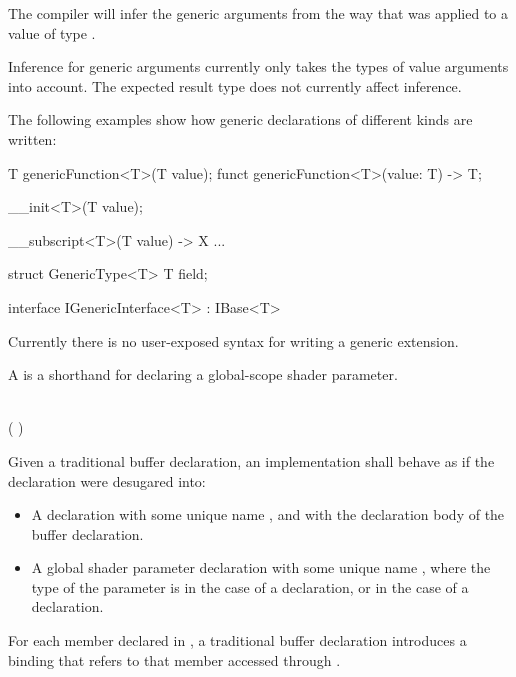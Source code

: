 The compiler will infer the generic arguments  from the way that  was applied to a value of type .

\begin{Note}
Inference for generic arguments currently only takes the types of value arguments into account.
The expected result type does not currently affect inference.
\end{Note}


The following examples show how generic declarations of different kinds are written:

\begin{codeblock}
T genericFunction<T>(T value);
funct genericFunction<T>(value: T) -> T;

__init<T>(T value);

__subscript<T>(T value) -> X { ... }

struct GenericType<T>
{
    T field;
}

interface IGenericInterface<T> : IBase<T>
{
}
\end{codeblock}

\begin{Note}
Currently there is no user-exposed syntax for writing a generic extension.
\end{Note}

\begin{Legacy}


A  is a shorthand for declaring a global-scope shader parameter.

\begin{Syntax}
     \\
        ( \SynOr {})   \code{;}\SynOpt
\end{Syntax}

Given a traditional buffer declaration, an implementation shall behave as if the declaration were desugared into:

\begin{itemize}
\item A  declaration with some unique name , and with the declaration body of the buffer declaration.
\item A global shader parameter declaration with some unique name , where the type of the parameter is  in the case of a  declaration, or  in the case of a  declaration.
\end{itemize}

For each member declared in , a traditional buffer declaration introduces a binding that refers to that member accessed through .

\end{Legacy}